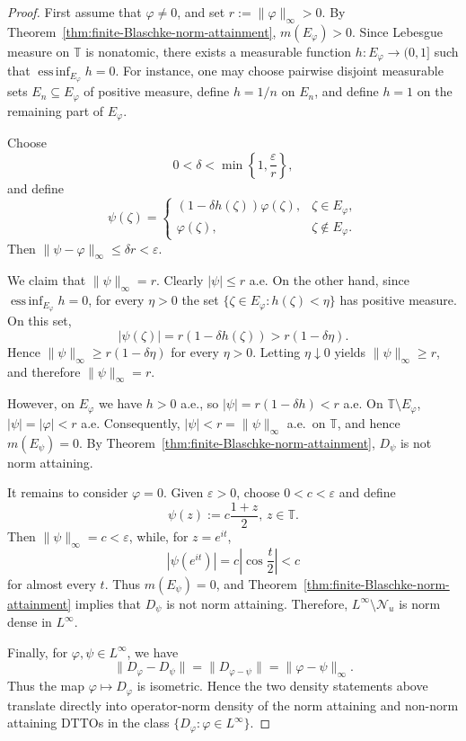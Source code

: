 \documentclass[12pt]{amsart}
\theoremstyle{definition}
\theoremstyle{remark}
\def \T{\mathbb{T}}
\newcommand{\vp}{\varphi}
\numberwithin{equation}{section}
\begin{document}
\begin{proof}
First assume that $\vp\neq0$, and set $r:=\|\vp\|_\infty>0$. By Theorem~\ref{thm:finite-Blaschke-norm-attainment}, $m(E_\vp)>0$. Since Lebesgue measure on $\T$ is nonatomic, there exists a measurable function $h:E_\vp\to(0,1]$ such that $\operatorname*{ess\,inf}_{E_\vp}h=0$. For instance, one may choose
pairwise disjoint measurable sets $E_n\subseteq E_\vp$ of positive
measure, define $h=1/n$ on $E_n$, and define $h=1$ on the remaining
part of $E_\vp$.
	
Choose
\[
0<\delta<\min\left\{1,\frac{\varepsilon}{r}\right\},
\]
and define
\[
\psi(\zeta)=
\begin{cases}
(1-\delta h(\zeta))\vp(\zeta),
& \zeta\in E_\vp,\\
\vp(\zeta),
& \zeta\notin E_\vp.
\end{cases}
\]
Then $\|\psi-\vp\|_\infty\leq\delta r<\varepsilon$.
	
We claim that $\|\psi\|_\infty=r$. Clearly $|\psi|\leq r$ a.e.
On the other hand, since $\operatorname*{ess\,inf}_{E_\vp}h=0$, for every $\eta>0$ the set $\{\zeta\in E_\vp:h(\zeta)<\eta\}$ has positive measure. On this set,
\[
|\psi(\zeta)|=r(1-\delta h(\zeta))>r(1-\delta\eta).
\]
Hence $\|\psi\|_\infty\geq r(1-\delta\eta)$ for every $\eta>0$.
Letting $\eta\downarrow0$ yields $\|\psi\|_\infty\geq r$, and therefore $\|\psi\|_\infty=r$.
	
However, on $E_\vp$ we have $h>0$ a.e., so $|\psi|=r(1-\delta h)<r$ a.e. On $\T\setminus E_\vp$, $|\psi|=|\vp|<r$ a.e. Consequently,
$|\psi|<r=\|\psi\|_\infty$ a.e.\ on $\T$, and hence $m(E_\psi)=0$. By
Theorem~\ref{thm:finite-Blaschke-norm-attainment}, $D_\psi$ is not norm attaining.
	
It remains to consider $\vp=0$. Given $\varepsilon>0$, choose
$0<c<\varepsilon$ and define
\[
\psi(z):=c\frac{1+z}{2},\, z\in \T.
\]
Then $\|\psi\|_\infty=c<\varepsilon$, while, for $z=e^{it}$,
\[
|\psi(e^{it})|=c\left|\cos\frac{t}{2}\right|<c
\]
for almost every $t$. Thus $m(E_\psi)=0$, and Theorem~\ref{thm:finite-Blaschke-norm-attainment} implies that
$D_\psi$ is not norm attaining. Therefore, $L^\infty\setminus\mathcal{N}_u$ is norm dense in $L^\infty$.
	
Finally, for $\vp,\psi\in L^\infty$, we have
\[
\|D_\vp-D_\psi\|=\|D_{\vp-\psi}\|=\|\vp-\psi\|_\infty.
\]
Thus the map $\vp\mapsto D_\vp$ is isometric. Hence the two density
statements above translate directly into operator-norm density of the
norm attaining and non-norm attaining DTTOs in the class $\{D_\vp:\vp\in L^\infty\}$.
\end{proof}
\end{document}

